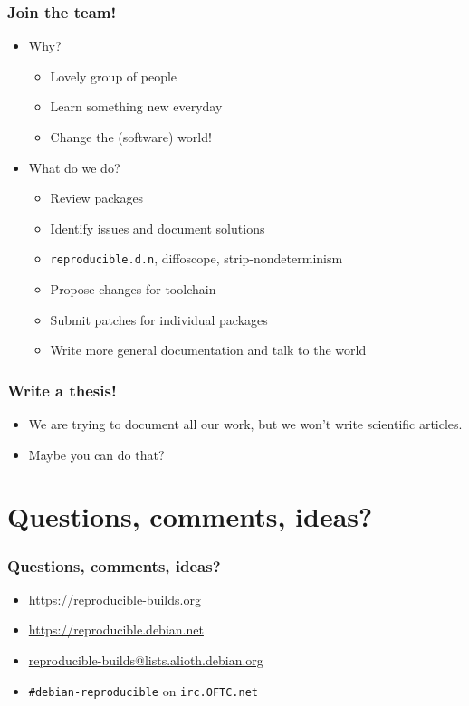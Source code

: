 \documentclass[14pt]{beamer}
\begin{document}
\begin{frame}
 \frametitle{Join the team!}

 \begin{itemize}
  \item Why?
   \begin{itemize}
    \item \heartsuit{}\heartsuit{}\heartsuit{} Lovely group of people \heartsuit{}\heartsuit{}\heartsuit{}
    \item Learn something new everyday
    \item Change the (software) world!
   \end{itemize}
  \item What do we do?
   \begin{itemize}
    \item Review packages
    \item Identify issues and document solutions
    \item \texttt{reproducible.d.n}, diffoscope, strip-nondeterminism
    \item Propose changes for toolchain
    \item Submit patches for individual packages
    \item Write more general documentation and talk to the world
   \end{itemize}
 \end{itemize}
\end{frame}

\begin{frame}
 \frametitle{Write a thesis!}

 \begin{itemize}
  \item We are trying to document all our work, but we won't write scientific articles.
  \item Maybe you can do that?
 \end{itemize}
\end{frame}


\section{Questions, comments, ideas?}


\begin{frame}
 \frametitle{Questions, comments, ideas?}

 \begin{itemize}
  \item \url{https://reproducible-builds.org}
  \item \url{https://reproducible.debian.net}
  \item \href{mailto:reproducible-builds@lists.alioth.debian.org}{reproducible-builds@lists.alioth.debian.org}
  \item \texttt{\#debian-reproducible} on \texttt{irc.OFTC.net}
 \end{itemize}
\end{frame}
\end{document}
